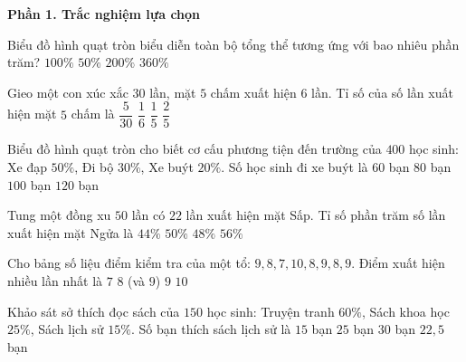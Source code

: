 \textbf{Phần 1. Trắc nghiệm lựa chọn}

\begin{ex} %
Biểu đồ hình quạt tròn biểu diễn toàn bộ tổng thể tương ứng với bao nhiêu phần trăm?
\choice
{\True $100\%$}
{$50\%$}
{$200\%$}
{$360\%$}
\end{ex}

\begin{ex} %
Gieo một con xúc xắc $30$ lần, mặt $5$ chấm xuất hiện $6$ lần. Tỉ số của số lần xuất hiện mặt $5$ chấm là
\choice
{$\dfrac{5}{30}$}
{$\dfrac{1}{6}$}
{\True $\dfrac{1}{5}$}
{$\dfrac{2}{5}$}
\end{ex}

\begin{ex} %
Biểu đồ hình quạt tròn cho biết cơ cấu phương tiện đến trường của $400$ học sinh: Xe đạp $50\%$, Đi bộ $30\%$, Xe buýt $20\%$. Số học sinh đi xe buýt là
\choice
{$60$ bạn}
{\True $80$ bạn}
{$100$ bạn}
{$120$ bạn}
\end{ex}

\begin{ex} %
Tung một đồng xu $50$ lần có $22$ lần xuất hiện mặt Sấp. Tỉ số phần trăm số lần xuất hiện mặt Ngửa là
\choice
{$44\%$}
{$50\%$}
{$48\%$}
{\True $56\%$}
\end{ex}

\begin{ex} %
Cho bảng số liệu điểm kiểm tra của một tổ: $9, 8, 7, 10, 8, 9, 8, 9$. Điểm xuất hiện nhiều lần nhất là
\choice
{$7$}
{\True $8$ (và $9$)}
{$9$}
{$10$}
\end{ex}

\begin{ex} %
Khảo sát sở thích đọc sách của $150$ học sinh: Truyện tranh $60\%$, Sách khoa học $25\%$, Sách lịch sử $15\%$. Số bạn thích sách lịch sử là
\choice
{$15$ bạn}
{$25$ bạn}
{$30$ bạn}
{\True $22{,}5$ bạn}
\end{ex}

